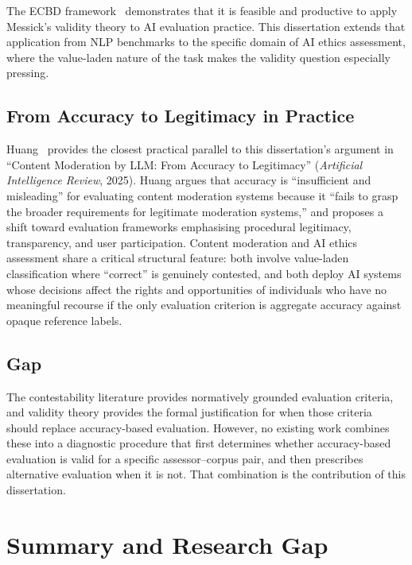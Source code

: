 The ECBD framework~\cite{ecbd2024} demonstrates that it is feasible and
productive to apply Messick's validity theory to AI evaluation practice.  This
dissertation extends that application from NLP benchmarks to the specific
domain of AI ethics assessment, where the value-laden nature of the task makes
the validity question especially pressing.

\subsection{From Accuracy to Legitimacy in Practice}

Huang~\cite{huang2025moderation} provides the closest practical parallel to
this dissertation's argument in ``Content Moderation by LLM: From Accuracy to
Legitimacy'' (\emph{Artificial Intelligence Review}, 2025).  Huang argues that
accuracy is ``insufficient and misleading'' for evaluating content moderation
systems because it ``fails to grasp the broader requirements for legitimate
moderation systems,'' and proposes a shift toward evaluation frameworks
emphasising procedural legitimacy, transparency, and user participation.
Content moderation and AI ethics assessment share a critical structural feature:
both involve value-laden classification where ``correct'' is genuinely
contested, and both deploy AI systems whose decisions affect the rights and
opportunities of individuals who have no meaningful recourse if the only
evaluation criterion is aggregate accuracy against opaque reference labels.

\subsection{Gap}

The contestability literature provides normatively grounded evaluation
criteria, and validity theory provides the formal justification for when those
criteria should replace accuracy-based evaluation.  However, no existing work
combines these into a diagnostic procedure that first determines whether
accuracy-based evaluation is valid for a specific assessor--corpus pair, and
then prescribes alternative evaluation when it is not.  That combination is
the contribution of this dissertation.

\section{Summary and Research Gap}

